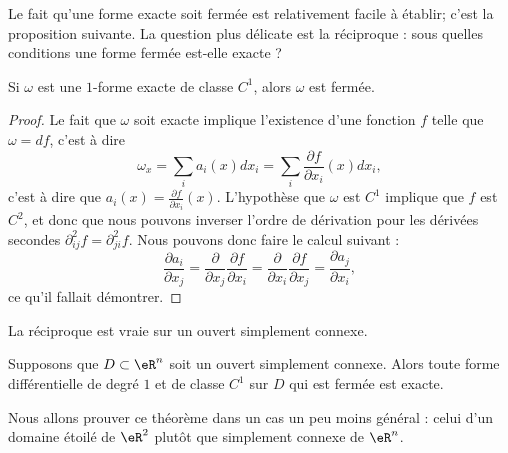 Le fait qu'une forme exacte soit fermée est relativement facile à établir; c'est la proposition suivante. La question plus délicate est la réciproque : sous quelles conditions une forme fermée est-elle exacte ?
\begin{proposition}
	Si $\omega$ est une $1$-forme exacte de classe $C^1$, alors $\omega$ est fermée.
\end{proposition}

\begin{proof}
	Le fait que $\omega$ soit exacte implique l'existence d'une fonction $f$ telle que $\omega=df$, c'est à dire
	\begin{equation}
		\omega_x=\sum_i a_i(x)dx_i=\sum_i\frac{ \partial f }{ \partial x_i }(x)dx_i,
	\end{equation}
	c'est à dire que $a_i(x)=\frac{ \partial f }{ \partial x_i }(x)$. L'hypothèse que $\omega$ est $C^1$ implique que $f$ est $C^2$, et donc que nous pouvons inverser l'ordre de dérivation pour les dérivées secondes $\partial^2_{ij}f=\partial^2_{ji}f$. Nous pouvons donc faire le calcul suivant :
	\begin{equation}
		\frac{ \partial a_i }{ \partial x_j }=\frac{ \partial  }{ \partial x_j }\frac{ \partial f }{ \partial x_i }=\frac{ \partial  }{ \partial x_i }\frac{ \partial f }{ \partial x_j }=\frac{ \partial a_j }{ \partial x_i },
	\end{equation}
	ce qu'il fallait démontrer.
\end{proof}

La réciproque est vraie sur un ouvert simplement connexe.
\begin{theorem}        \label{ThoFermeExactFormRappel}
Supposons que $D\subset\eR^n$ soit un ouvert simplement connexe. Alors toute forme différentielle de degré $1$ et de classe $C^1$ sur $D$ qui est fermée est exacte.
\end{theorem}

Nous allons prouver ce théorème dans un cas un peu moins général : celui d'un domaine étoilé de \( \eR^2\) plutôt que simplement connexe de \( \eR^n\).

